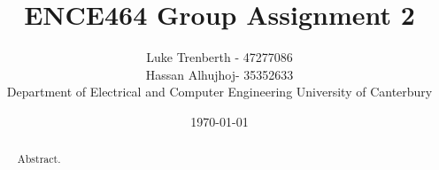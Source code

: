 \documentclass[a4paper, 12pt]{article}
\title{\vspace{-1cm} ENCE464 Group Assignment 2}
\author{Luke Trenberth - 47277086 \\ Hassan Alhujhoj-  35352633\\
	\small Department of Electrical and Computer Engineering University of Canterbury}
\date{\today}
\begin{document}
     \title{}
    \maketitle
    \begin{abstract}
Abstract.
    \end{abstract}

     
    
    
\end{document}
